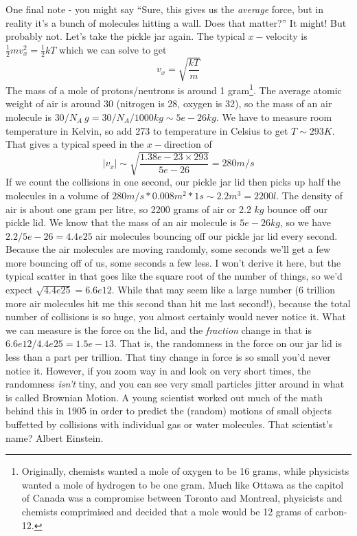 \documentclass[letterpaper,11pt,preprint]{aastex}
\begin{document}
One final note - you might say ``Sure, this gives us the
\textit{average} force, but in reality it's a bunch of molecules
hitting a wall.  Does that matter?''  It might!  But probably not.
Let's take the pickle jar again.  The typical $x-$velocity is
$\frac{1}{2}mv_x^2=\frac{1}{2}kT$ which we can solve to get
\begin{equation}
  v_x=\sqrt{\frac{kT}{m}}
\end{equation}
The mass of a mole of protons/neutrons is around 1
gram\footnote{Originally, chemists wanted a mole of oxygen to be 16
grams, while physicists wanted a mole of hydrogen to be one gram.
Much like Ottawa as the capitol of Canada was a compromise between
Toronto and Montreal, physicists and chemists comprimised and decided
that a mole would be 12 grams of carbon-12.}.  The
average atomic weight of air is around 30 (nitrogen is 28, oxygen is
32), so the mass of an air molecule is $30/N_A\ g=30/N_A/1000kg \sim
5e-26 kg$.  We have to measure room temperature in Kelvin, so add 273
to temperature in Celsius to get $T\sim 293K$.  That gives a typical
speed in the $x-$direction of
\begin{equation}
  |v_x|\sim \sqrt{\frac{1.38e-23\times 293}{5e-26} }=280 m/s
\end{equation}
If we count the collisions in one second, our pickle jar lid then
picks up half the molecules in a volume of $280 m/s *0.008 m^2 *1 s
\sim 2.2 m^3 = 2200l$.  The density of air is about one gram per
litre, so 2200 grams of air or 2.2 $kg$ bounce off our pickle lid.  We
know that the mass of an air molecule is $5e-26 kg$, so we have
$2.2/5e-26=4.4e25$ air molecules bouncing off our pickle jar lid every
second.  Because the air molecules are moving randomly, some seconds
we'll get a few more bouncing off of us, some seconds a few less.  I
won't derive it here, but the typical scatter in that goes like the
square root of the number of things, so we'd expect
$\sqrt{4.4e25}=6.6e12$.  While that may seem like a large number (6
trillion more air molecules hit me this second than hit me last
second!), because the total number of collisions is so huge, you
almost certainly would never notice it.  What we can measure is the
force on the lid, and the \textit{fraction} change in that is
$6.6e12/4.4e25=1.5e-13$.  That is, the randomness in the force on our
jar lid is less than a part per trillion.  That tiny change in force
is so small you'd never notice it.  However, if you zoom way in and
look on very short times, the randomness \textit{isn't} tiny, and you
can see very small particles jitter around in what is
called Brownian Motion.  A young scientist worked out much of the math
behind this in 1905 in order to predict the (random) motions of small
objects buffetted by collisions with individual gas or water
molecules.  That scientist's name?  Albert Einstein.
\end{document}
